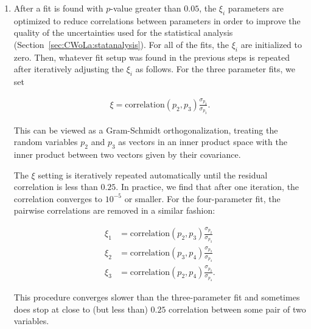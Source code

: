 \begin{enumerate}
\item \label{fitstep:4} After a fit is found with $p$-value greater than $0.05$, the $\xi_i$ parameters are optimized to reduce correlations between parameters in order to improve the quality of the uncertainties used for the statistical analysis (Section~\ref{sec:CWoLa:statanalysis}).
  For all of the fits, the $\xi_i$ are initialized to zero.
  Then, whatever fit setup was found in the previous steps is repeated after iteratively adjusting the $\xi_i$ as follows.
  For the three parameter fits, we set

\begin{align}
\xi=\text{correlation}(p_2,p_3)\frac{\sigma_{p_2}}{\sigma_{p_3}}.
\end{align}

\noindent This can be viewed as a Gram-Schmidt orthogonalization, treating the random variables $p_2$ and $p_3$ as vectors in an inner product space with the inner product between two vectors given by their covariance.

%

\noindent The $\xi$ setting is iteratively repeated automatically until the residual correlation is less than $0.25$.
In practice, we find that after one iteration, the correlation converges to $10^{-5}$ or smaller.
For the four-parameter fit, the pairwise correlations are removed in a similar fashion:

\begin{align}
\xi_1&=\text{correlation}(p_2,p_3)\frac{\sigma_{p_2}}{\sigma_{p_3}}\\
\xi_2&=\text{correlation}(p_3,p_4)\frac{\sigma_{p_3}}{\sigma_{p_4}}\\
\xi_3&=\text{correlation}(p_2,p_4)\frac{\sigma_{p_2}}{\sigma_{p_4}}.
\end{align}

\noindent This procedure converges slower than the three-parameter fit and sometimes does stop at close to (but less than) $0.25$ correlation between some pair of two variables.


\end{enumerate}
